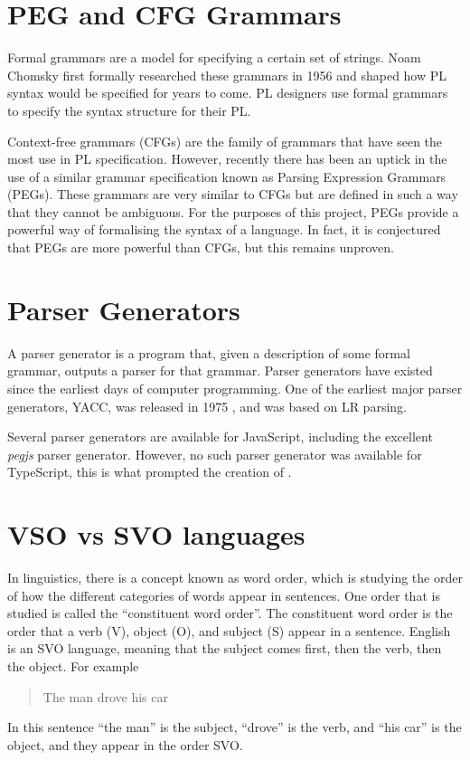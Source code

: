 \section{PEG and CFG Grammars}

Formal grammars are a model for specifying a certain set of strings. Noam Chomsky first formally researched these grammars in 1956\cite{chomskypaper} and shaped how PL syntax would be specified for years to come. PL designers use formal grammars to specify the syntax structure for their PL.

Context-free grammars (CFGs) are the family of grammars that have seen the most use in PL specification. However, recently there has been an uptick in the use of a similar grammar specification known as Parsing Expression Grammars (PEGs). These grammars are very similar to CFGs but are defined in such a way that they cannot be ambiguous.
For the purposes of this project, PEGs provide a powerful way of formalising the syntax of a language. In fact, it is conjectured that PEGs are more powerful than CFGs, but this remains unproven\cite{pegconjecture}.

\section{Parser Generators}

A parser generator is a program that, given a description of some formal grammar, outputs a parser for that grammar. Parser generators have existed since the earliest days of computer programming. One of the earliest major parser generators, YACC, was released in 1975 \cite{yacc}, and was based on LR parsing.

Several parser generators are available for JavaScript, including the excellent \emph{pegjs} parser generator. However, no such parser generator was available for TypeScript, this is what prompted the creation of \tsPEG{}.

\section{VSO vs SVO languages}

In linguistics, there is a concept known as word order, which is studying the order of how the different categories of words appear in sentences. One order that is studied is called the ``constituent word order''. The constituent word order is the order that a verb (V), object (O), and subject (S) appear in a sentence\cite{wordorder}. English is an SVO language, meaning that the subject comes first, then the verb, then the object. For example
\begin{quote}
    The man drove his car
\end{quote}
In this sentence ``the man'' is the subject, ``drove'' is the verb, and ``his car'' is the object, and they appear in the order SVO.

